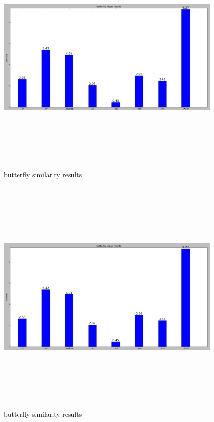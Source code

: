 		\begin{figure}[h] \label{bf_id}
			\includegraphics[width=\linewidth,height=12cm,keepaspectratio]{Figures/bf_id}
			\caption[butterfly similarity results]
			{butterfly similarity results}
		\end{figure}
		
		\begin{figure}[h] \label{bf_id}
			\includegraphics[width=\linewidth,height=12cm,keepaspectratio]{Figures/bf_id}
			\caption[butterfly similarity results]
			{butterfly similarity results}
		\end{figure}
		
		
